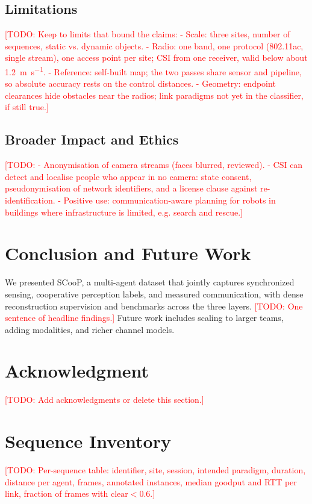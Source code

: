 \documentclass[conference]{IEEEtran}
\newcommand{\todo}[1]{\textcolor{red}{[TODO: #1]}}
\begin{document}
\subsection{Limitations}
\todo{Keep to limits that bound the claims:
- Scale: three sites, number of sequences, static vs. dynamic objects.
- Radio: one band, one protocol (802.11ac, single stream), one access
  point per site; CSI from one receiver, valid below about
  \SI{1.2}{\metre\per\second}.
- Reference: self-built map; the two passes share sensor and pipeline,
  so absolute accuracy rests on the control distances.
- Geometry: endpoint clearances hide obstacles near the radios; link
  paradigms not yet in the classifier, if still true.}

\subsection{Broader Impact and Ethics}
\todo{- Anonymisation of camera streams (faces blurred, reviewed).
- CSI can detect and localise people who appear in no camera: state
  consent, pseudonymisation of network identifiers, and a license
  clause against re-identification.
- Positive use: communication-aware planning for robots in buildings
  where infrastructure is limited, e.g. search and rescue.}

\section{Conclusion and Future Work}
\label{sec:conclusion}
We presented SCooP, a multi-agent dataset that jointly captures
synchronized sensing, cooperative perception labels, and measured
communication, with dense reconstruction supervision and benchmarks across
the three layers. \todo{One sentence of headline findings.} Future work
includes scaling to larger teams, adding modalities, and richer channel
models.

\section*{Acknowledgment}
\todo{Add acknowledgments or delete this section.}




\appendices
\section{Sequence Inventory}
\label{app:sequences}
\todo{Per-sequence table: identifier, site, session, intended
paradigm, duration, distance per agent, frames, annotated instances,
median goodput and RTT per link, fraction of frames with
$\mathrm{clear} < 0.6$.}
\end{document}
